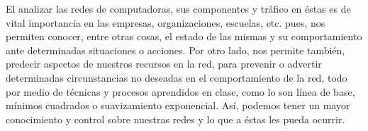 El analizar las redes de computadoras, sus componentes y tráfico en éstas es de vital importancia en las empresas, organizaciones, escuelas, etc. pues, nos permiten conocer, entre otras cosas, el estado de las mismas y su comportamiento ante determinadas situaciones o acciones. Por otro lado, nos permite también, predecir aspectos de nuestros recursos en la red, para prevenir o advertir determinadas circunstancias no deseadas en el comportamiento de la red, todo por medio de técnicas y procesos aprendidos en clase, como lo son línea de base, mínimos cuadrados o suavizamiento exponencial. Así, podemos tener un mayor conocimiento y control sobre nuestras redes y lo que a éstas les pueda ocurrir. 